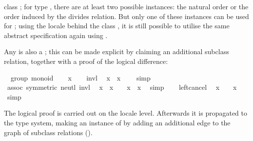 \begin{isabellebody}
\begin{isamarkuptext}
  class ; for type , there are at least two
  possible instances: the natural order or the order induced by the
  divides relation.  But only one of these instances can be used for
  \hyperlink{command.instantiation}{\mbox{}}; using the locale behind the class , it is still possible to utilise the same abstract
  specification again using \hyperlink{command.interpretation}{\mbox{}}.%
\end{isamarkuptext}%
\isamarkuptrue%
%
\isamarkuptrue%
%
\begin{isamarkuptext}%
Any  is also a ; this can be made
  explicit by claiming an additional subclass relation, together with
  a proof of the logical difference:%
\end{isamarkuptext}%
\isamarkuptrue%
%
\isadelimquote
%
\endisadelimquote
%
\isatagquote
{}\isamarkupfalse%
\ {\isacharparenleft}\ group{\isacharparenright}\ monoid\isanewline
{}\isamarkupfalse%
\isanewline
\ \ \isamarkupfalse%
\ x\isanewline
\ \ \isamarkupfalse%
\ invl\ \isamarkupfalse%
\ {\isachardoublequoteopen}x{\isasymdiv}\ {\isasymotimes}\ x\ {\isacharequal}\ {\isasymone}{\isachardoublequoteclose}\ \isamarkupfalse%
\ simp\isanewline
\ \ \isamarkupfalse%
\ assoc\ {\isacharbrackleft}symmetric{\isacharbrackright}\ neutl\ invl\ \isamarkupfalse%
\ {\isachardoublequoteopen}x{\isasymdiv}\ {\isasymotimes}\ {\isacharparenleft}x\ {\isasymotimes}\ {\isasymone}{\isacharparenright}\ {\isacharequal}\ x{\isasymdiv}\ {\isasymotimes}\ x{\isachardoublequoteclose}\ \isamarkupfalse%
\ simp\isanewline
\ \ \isamarkupfalse%
\ left{\isacharunderscore}cancel\ \isamarkupfalse%
\ {\isachardoublequoteopen}x\ {\isasymotimes}\ {\isasymone}\ {\isacharequal}\ x{\isachardoublequoteclose}\ \isamarkupfalse%
\ simp\isanewline
{}\isamarkupfalse%
%
\endisatagquote
{\isafoldquote}%
%
\isadelimquote
%
\endisadelimquote
%
\begin{isamarkuptext}%
The logical proof is carried out on the locale level.
  Afterwards it is propagated
  to the type system, making  an instance of
   by adding an additional edge
  to the graph of subclass relations
  ().


\end{isamarkuptext}
\end{isabellebody}
